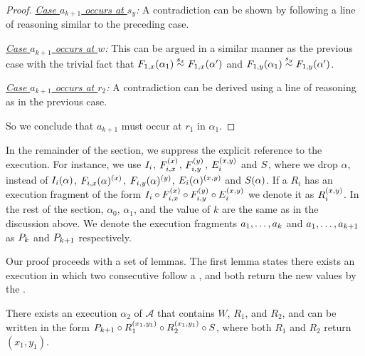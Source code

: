 \begin{proof}
\emph{ \underline{Case $a_{k+1}$ occurs at $s_y$}:} A  contradiction can be shown by following a line of reasoning similar to the  preceding case.

\emph{\underline{Case $a_{k+1}$ occurs at $w$}:}
This can be argued in a similar manner as the previous case with the trivial fact that $\frage{F_{1,x}}{\alpha_1}{} \stackrel{s_x}{\sim} \frage{F_{1,x}}{\alpha'}{}$ and $\frage{F_{1,y}}{\alpha_1}{} \stackrel{s_y}{\sim} \frage{F_{1,y}}{\alpha'}{}$.


\emph{\underline{Case $a_{k+1}$ occurs at $r_2$}:} 
A contradiction can be derived using a line of  reasoning as in the previous case.

So we conclude that $a_{k+1}$ must occur at $r_1$ in $\alpha_1$.
\end{proof}

In the remainder of the section, we suppress the explicit reference to the execution. For instance, we use $\fragt{I_i}{\alpha}{}$, $\fragt{F_{i,x}}{\alpha}{x}$, 
$\fragt{F_{i,y}}{\alpha}{y}$, $\fragt{E_i}{\alpha}{x, y}$ and $ \fragt{S}{\alpha}{}$, where we drop $\alpha$, 
instead of $\frage{I_i}{\alpha}{}$, $\frage{F_{i,x}}{\alpha}{x}$, 
$\frage{F_{i,y}}{\alpha}{y}$, $\frage{E_i}{\alpha}{x, y} $ and $ \frage{S}{\alpha}{}$.
If a 
\rot{} $R_i$ has an  execution fragment of the form 
$\fragt{I_i}{\alpha}{} \circ \fragt{F_{i,x}}{\alpha}{x} \circ 
\fragt{F_{i,y}}{\alpha}{y} \circ \fragt{E_i}{\alpha}{x, y} $
we denote it  as  $\fragt{R_i}{}{x, y}$. 
In the rest of the section, $\alpha_0$, $\alpha_1$, and the value of $k$ are the same as in the discussion above. We denote  the execution fragments  $\finiteprefixt{k}{k}$ and $\finiteprefixt{k}{k+1}$ as 
$\finiteprefixA{k}{k}$ and $\finiteprefixA{k}{k+1}$ respectively.

Our proof proceeds with a set of lemmas.  The first lemma states there exists an execution in which two consecutive \rots{} follow a \wot{}, and both \rots{}
return the new values by the \wot{}.

\begin{lemma} \label{lem:exec3_alpha2} 
\sloppy There exists an execution $\alpha_2$  of $\mathcal{A}$ that contains 
$W$, $R_1$, and $R_2$, and can be written in the form 
$\finiteprefixA{k}{k+1} \circ 
\frage{R_1}{}{x_1, y_1}
 \circ
 \frage{R_2}{}{x_1, y_1}
\circ \fragt{S}{\alpha_2}{}$, where both $R_1$ and $R_2$ return $(x_1, y_1)$.
\end{lemma}

